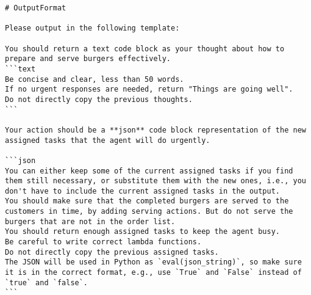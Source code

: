 \begin{lstlisting}
# OutputFormat

Please output in the following template:

You should return a text code block as your thought about how to prepare and serve burgers effectively.
```text
Be concise and clear, less than 50 words.
If no urgent responses are needed, return "Things are going well".
Do not directly copy the previous thoughts.
```

Your action should be a **json** code block representation of the new assigned tasks that the agent will do urgently.

```json
You can either keep some of the current assigned tasks if you find them still necessary, or substitute them with the new ones, i.e., you don't have to include the current assigned tasks in the output.
You should make sure that the completed burgers are served to the customers in time, by adding serving actions. But do not serve the burgers that are not in the order list.
You should return enough assigned tasks to keep the agent busy.
Be careful to write correct lambda functions.
Do not directly copy the previous assigned tasks.
The JSON will be used in Python as `eval(json_string)`, so make sure it is in the correct format, e.g., use `True` and `False` instead of `true` and `false`.
```
\end{lstlisting}

